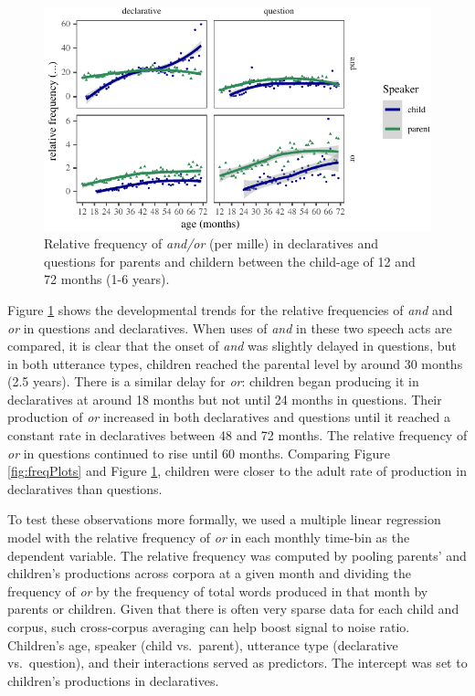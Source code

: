 \documentclass[
  english,
  ,man,floatsintext]{apa6}
\begin{document}
\begin{figure}[tb]

{\centering \includegraphics{figs/ageSpeechActPlot-1} 

}

\caption{Relative frequency of \textit{and/or} (per mille) in declaratives and questions for parents and childern between the child-age of 12 and 72 months (1-6 years).}\label{fig:ageSpeechActPlot}
\end{figure}

Figure \ref{fig:ageSpeechActPlot} shows the developmental trends for the relative frequencies of \emph{and} and \emph{or} in questions and declaratives. When uses of \emph{and} in these two speech acts are compared, it is clear that the onset of \emph{and} was slightly delayed in questions, but in both utterance types, children reached the parental level by around 30 months (2.5 years). There is a similar delay for \emph{or}: children began producing it in declaratives at around 18 months but not until 24 months in questions. Their production of \emph{or} increased in both declaratives and questions until it reached a constant rate in declaratives between 48 and 72 months. The relative frequency of \emph{or} in questions continued to rise until 60 months. Comparing Figure \ref{fig:freqPlots} and Figure \ref{fig:ageSpeechActPlot}, children were closer to the adult rate of production in declaratives than questions.

To test these observations more formally, we used a multiple linear regression model with the relative frequency of \emph{or} in each monthly time-bin as the dependent variable. The relative frequency was computed by pooling parents' and children's productions across corpora at a given month and dividing the frequency of \emph{or} by the frequency of total words produced in that month by parents or children. Given that there is often very sparse data for each child and corpus, such cross-corpus averaging can help boost signal to noise ratio. Children's age, speaker (child vs.~parent), utterance type (declarative vs.~question), and their interactions served as predictors. The intercept was set to children's productions in declaratives.
\end{document}
